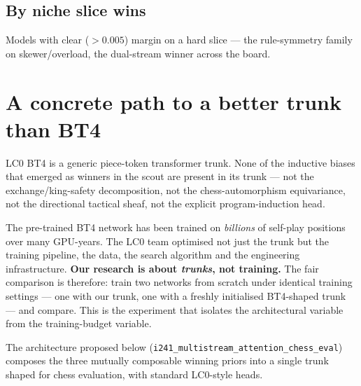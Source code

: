 \documentclass[10pt,a4paper]{article}
\begin{document}
\subsection*{By niche slice wins}
Models with clear ($>0.005$) margin on a hard slice --- the rule-symmetry
family on skewer/overload, the dual-stream winner across the board.

\clearpage
\section{A concrete path to a better trunk than BT4}

LC0 BT4 is a generic piece-token transformer trunk. None of the inductive
biases that emerged as winners in the scout are present in its trunk --- not
the exchange/king-safety decomposition, not the chess-automorphism
equivariance, not the directional tactical sheaf, not the explicit
program-induction head.

\begin{tcolorbox}[goodcallout, title=Scope of the claim]
The pre-trained BT4 network has been trained on \emph{billions} of self-play
positions over many GPU-years. The LC0 team optimised not just the trunk but
the training pipeline, the data, the search algorithm and the engineering
infrastructure. \textbf{Our research is about \emph{trunks}, not training.}
The fair comparison is therefore: train two networks from scratch under
identical training settings --- one with our trunk, one with a freshly
initialised BT4-shaped trunk --- and compare. This is the experiment that
isolates the architectural variable from the training-budget variable.
\end{tcolorbox}

The architecture proposed below
(\texttt{i241\_multistream\_attention\_chess\_eval}) composes the three
mutually composable winning priors into a single trunk shaped for chess
evaluation, with standard LC0-style heads.

\medskip
\end{document}
